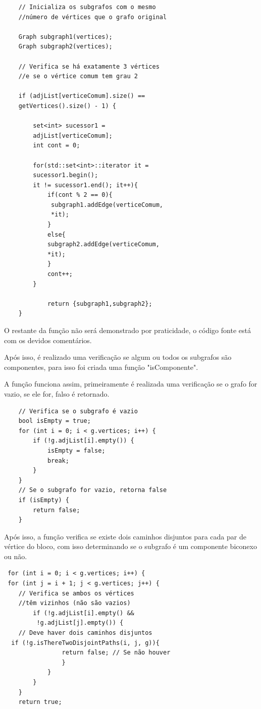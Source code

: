 \documentclass[10pt,conference]{IEEEtran}
\begin{document}
\begin{lstlisting}
    // Inicializa os subgrafos com o mesmo
    //número de vértices que o grafo original
    
    Graph subgraph1(vertices);
    Graph subgraph2(vertices);
    
    // Verifica se há exatamente 3 vértices
    //e se o vértice comum tem grau 2
    
    if (adjList[verticeComum].size() == 
    getVertices().size() - 1) {
    
        set<int> sucessor1 = 
        adjList[verticeComum];
        int cont = 0;
        
        for(std::set<int>::iterator it = 
        sucessor1.begin(); 
        it != sucessor1.end(); it++){
            if(cont % 2 == 0){
             subgraph1.addEdge(verticeComum, 
             *it);
            }
            else{
            subgraph2.addEdge(verticeComum, 
            *it);
            }
            cont++;
        }
            
            return {subgraph1,subgraph2};        
    }
\end{lstlisting}
O restante da função não será demonstrado por praticidade, o código fonte está com os devidos comentários.

Após isso, é realizado uma verificação se algum ou todos os subgrafos são componentes, para isso foi criada uma função "isComponente".

A função funciona assim, primeiramente é realizada uma verificação se o grafo for vazio, se ele for, falso é retornado. 
\begin{lstlisting}
    // Verifica se o subgrafo é vazio
    bool isEmpty = true;
    for (int i = 0; i < g.vertices; i++) {
        if (!g.adjList[i].empty()) {
            isEmpty = false;
            break;
        }
    }
    // Se o subgrafo for vazio, retorna false
    if (isEmpty) {
        return false;
    }
\end{lstlisting}

Após isso, a função verifica se existe dois caminhos disjuntos para cada par de vértice do bloco, com isso determinando se o subgrafo é um componente biconexo ou não.


\begin{lstlisting}
 for (int i = 0; i < g.vertices; i++) {
 for (int j = i + 1; j < g.vertices; j++) {
    // Verifica se ambos os vértices 
    //têm vizinhos (não são vazios)
        if (!g.adjList[i].empty() && 
         !g.adjList[j].empty()) {
    // Deve haver dois caminhos disjuntos
  if (!g.isThereTwoDisjointPaths(i, j, g)){
                return false; // Se não houver 
                }
            }
        }
    }
    return true;
\end{lstlisting}
\end{document}
